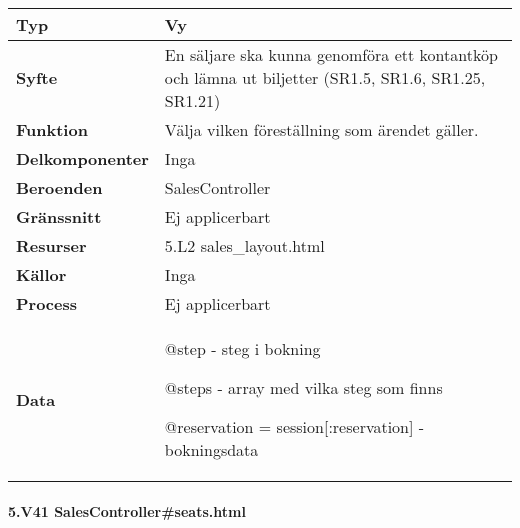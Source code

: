 \documentclass[a4paper, twoside, 11pt, titlepage]{article}
\begin{document}
			\begin {table} [ht] \begin{tabular} {  p{3.5cm} p{11.6cm} }
				\hline
				{\sffamily\textbf{Typ}} & {Vy} \\
				\hline
				{\sffamily\textbf{Syfte}} & {En säljare ska kunna genomföra ett kontantköp och lämna ut biljetter (SR1.5, SR1.6, SR1.25, SR1.21)} \\
				\hline
				{\sffamily\textbf{Funktion}} & {Välja vilken föreställning som ärendet gäller.} \\
				\hline
				{\sffamily\textbf{Delkomponenter}} & {Inga} \\
				\hline
				{\sffamily\textbf{Beroenden}} & {SalesController} \\
				\hline
				{\sffamily\textbf{Gränssnitt}} & {Ej applicerbart} \\
				\hline
				{\sffamily\textbf{Resurser}} & {5.L2 sales\_layout.html} \\
				\hline
				{\sffamily\textbf{Källor}} & {Inga} \\
				\hline
				{\sffamily\textbf{Process}} & {Ej applicerbart} \\
				\hline
				{\sffamily\textbf{Data}} & {@step - steg i bokning

@steps - array med vilka steg som finns

@reservation = session[:reservation] - bokningsdata} \\
				\hline
			\end{tabular} \end{table} \FloatBarrier


			\paragraph{5.V41 SalesController\#seats.html}\
\end{document}
